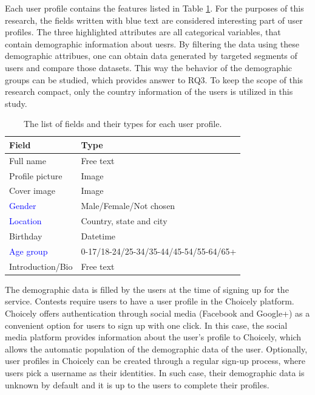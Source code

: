 Each user profile contains the features listed in Table \ref{user_profile_fields}. For the purposes of this research, the fields written with blue text are considered interesting part of user profiles. The three highlighted attributes are all categorical variables, that contain demographic information about uesrs. By filtering the data using these demographic attribues, one can obtain data generated by targeted segments of users and compare those datasets. This way the behavior of the demographic groups can be studied, which provides answer to RQ3. To keep the scope of this research compact, only the country information of the users is utilized in this study.

\begin{table}[]
    \centering
    \begin{tabular}{l|l}
        \textbf{Field}              & \textbf{Type} \\
        \hline
        Full name                   & Free text \\
        Profile picture             & Image \\ 
        Cover image                 & Image \\
        \textcolor{blue}{Gender}    & Male/Female/Not chosen \\
        \textcolor{blue}{Location}  & Country, state and city \\
        Birthday                    & Datetime \\ 
        \textcolor{blue}{Age group} & 0-17/18-24/25-34/35-44/45-54/55-64/65+ \\
        Introduction/Bio            & Free text
    \end{tabular}
    \caption{The list of fields and their types for each user profile.}
    \label{user_profile_fields}
\end{table}  

The demographic data is filled by the users at the time of signing up for the service. Contests require users to have a user profile in the Choicely platform. Choicely offers authentication through social media (Facebook and Google+) as a convenient option for users to sign up with one click. In this case, the social media platform provides information about the user's profile to Choicely, which allows the automatic population of the demographic data of the user. Optionally, user profiles in Choicely can be created through a regular sign-up process, where users pick a username as their identities. In such case, their demographic data is unknown by default and it is up to the users to complete their profiles. 

